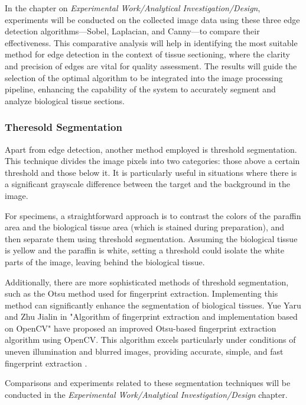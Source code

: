 In the chapter on \textit{Experimental Work/Analytical Investigation/Design}, experiments will be conducted on the collected image data using these three edge detection algorithms—Sobel, Laplacian, and Canny—to compare their effectiveness. This comparative analysis will help in identifying the most suitable method for edge detection in the context of tissue sectioning, where the clarity and precision of edges are vital for quality assessment. The results will guide the selection of the optimal algorithm to be integrated into the image processing pipeline, enhancing the capability of the system to accurately segment and analyze biological tissue sections.

\subsubsection{Theresold Segmentation}

Apart from edge detection, another method employed is threshold segmentation. This technique divides the image pixels into two categories: those above a certain threshold and those below it. It is particularly useful in situations where there is a significant grayscale difference between the target and the background in the image.

For specimens, a straightforward approach is to contrast the colors of the paraffin area and the biological tissue area (which is stained during preparation), and then separate them using threshold segmentation. Assuming the biological tissue is yellow and the paraffin is white, setting a threshold could isolate the white parts of the image, leaving behind the biological tissue.

Additionally, there are more sophisticated methods of threshold segmentation, such as the Otsu method used for fingerprint extraction. Implementing this method can significantly enhance the segmentation of biological tissues. Yue Yaru and Zhu Jialin in "Algorithm of fingerprint extraction and implementation based on OpenCV" have proposed an improved Otsu-based fingerprint extraction algorithm using OpenCV. This algorithm excels particularly under conditions of uneven illumination and blurred images, providing accurate, simple, and fast fingerprint extraction \cite{3.3}.

Comparisons and experiments related to these segmentation techniques will be conducted in the \textit{Experimental Work/Analytical Investigation/Design} chapter.









